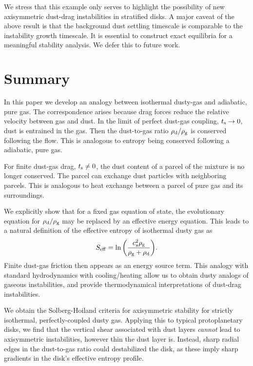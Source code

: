 We stress that this example only serves to highlight
the possibility of new axisymmetric dust-drag instabilities in
stratified disks. A major caveat of the above result is that 
 the background dust settling timescale is comparable to the instability
growth timescale. It is essential to construct
exact equilibria for a meaningful stability analysis. We defer this
to future work.  


\section{Summary}\label{summary}
In this paper we develop an analogy between isothermal 
dusty-gas and adiabatic, pure gas. The correspondence arises
because drag forces reduce the relative velocity between gas and
dust. In the limit of perfect dust-gas coupling, $t_\mathrm{s} \to 0$,  
 dust is entrained in 
the gas. Then the dust-to-gas ratio $\rho_\mathrm{d}/\rho_\mathrm{g}$ is conserved
following the flow. This is analogous to entropy being conserved
following a adiabatic, pure gas. 

For finite dust-gas drag, $t_\mathrm{s}\neq 0$, the dust content of a 
parcel of the mixture is no longer conserved. The parcel 
can exchange dust particles with neighboring parcels. %
This is analogous to heat exchange between a parcel of pure gas and its surroundings.   

We explicitly show that for a fixed gas equation of state, the  
evolutionary equation for $\rho_\mathrm{d}/\rho_\mathrm{g}$ may be replaced by an 
effective energy equation. This leads to a 
natural definition of the effective entropy of isothermal dusty gas as  
\begin{align*}
  S_\mathrm{eff}  = \ln{\left(\frac{c_s^2\rho_\mathrm{g}}{\rho_\mathrm{g}+\rho_\mathrm{d}}\right)}.  
\end{align*}
Finite dust-gas friction then appears as an energy
source term.  This analogy with standard 
hydrodynamics with cooling/heating allow us to obtain dusty analogs of gaseous
instabilities, and provide thermodynamical interpretations of  
dust-drag instabilities. 


We obtain the Solberg-Hoiland criteria for axisymmetric stability for
strictly isothermal, perfectly-coupled dusty gas.  
Applying this to typical protoplanetary disks, we find that 
the vertical shear associated with dust 
 layers \emph{cannot} lead to axisymmetric  
  instabilities, however thin the dust layer is.   
Instead, sharp radial  edges in the dust-to-gas ratio could destabilized the
disk, as these imply sharp gradients in the disk's effective entropy
profile. %

